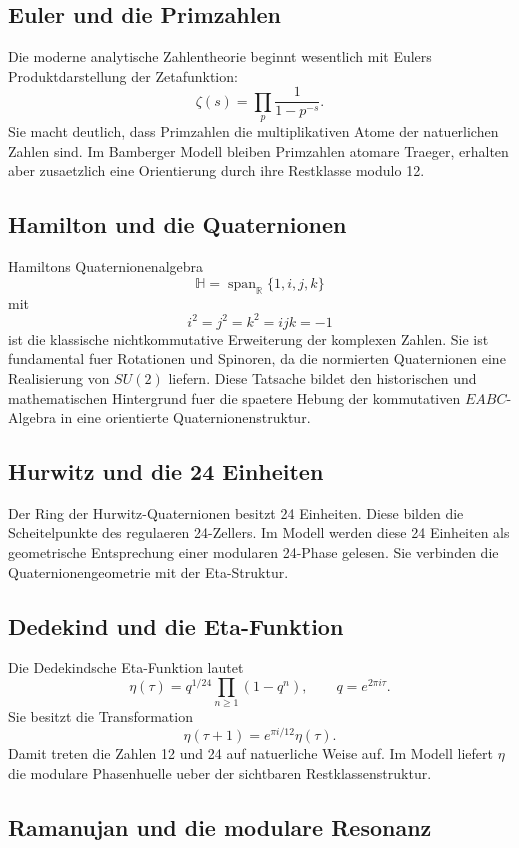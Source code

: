 \documentclass[11pt,a4paper]{article}
\theoremstyle{definition}
\theoremstyle{remark}
\DeclareMathOperator{\Span}{span}
\newcommand{\R}{\mathbb R}
\newcommand{\HH}{\mathbb H}
\begin{document}
\subsection{Euler und die Primzahlen}

Die moderne analytische Zahlentheorie beginnt wesentlich mit Eulers
Produktdarstellung der Zetafunktion:
\[
\zeta(s)=\prod_p \frac{1}{1-p^{-s}}.
\]
Sie macht deutlich, dass Primzahlen die multiplikativen Atome der natuerlichen
Zahlen sind. Im Bamberger Modell bleiben Primzahlen atomare Traeger, erhalten
aber zusaetzlich eine Orientierung durch ihre Restklasse modulo 12.

\subsection{Hamilton und die Quaternionen}

Hamiltons Quaternionenalgebra
\[
\HH=\Span_{\R}\{1,i,j,k\}
\]
mit
\[
i^2=j^2=k^2=ijk=-1
\]
ist die klassische nichtkommutative Erweiterung der komplexen Zahlen. Sie ist
fundamental fuer Rotationen und Spinoren, da die normierten Quaternionen eine
Realisierung von \(SU(2)\) liefern. Diese Tatsache bildet den historischen und
mathematischen Hintergrund fuer die spaetere Hebung der kommutativen
\(EABC\)-Algebra in eine orientierte Quaternionenstruktur.

\subsection{Hurwitz und die 24 Einheiten}

Der Ring der Hurwitz-Quaternionen besitzt 24 Einheiten. Diese bilden die
Scheitelpunkte des regulaeren 24-Zellers. Im Modell werden diese 24 Einheiten
als geometrische Entsprechung einer modularen 24-Phase gelesen. Sie verbinden
die Quaternionengeometrie mit der Eta-Struktur.

\subsection{Dedekind und die Eta-Funktion}

Die Dedekindsche Eta-Funktion lautet
\[
\eta(\tau)=q^{1/24}\prod_{n\ge 1}(1-q^n),\qquad q=e^{2\pi i\tau}.
\]
Sie besitzt die Transformation
\[
\eta(\tau+1)=e^{\pi i/12}\eta(\tau).
\]
Damit treten die Zahlen 12 und 24 auf natuerliche Weise auf. Im Modell liefert
\(\eta\) die modulare Phasenhuelle ueber der sichtbaren Restklassenstruktur.

\subsection{Ramanujan und die modulare Resonanz}
\end{document}

